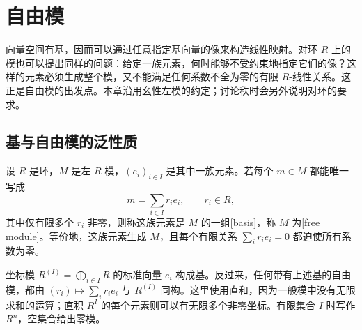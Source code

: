 
\section{自由模}
\label{b2:sec:0301}

向量空间有基，因而可以通过任意指定基向量的像来构造线性映射。对环 \(R\) 上的模也可以提出同样的问题：给定一族元素，何时能够不受约束地指定它们的像？这样的元素必须生成整个模，又不能满足任何系数不全为零的有限 \(R\)-线性关系。这正是自由模的出发点。本章沿用幺性左模的约定；讨论秩时会另外说明对环的要求。

%
%

\subsection{基与自由模的泛性质}
\label{b2:subsec:0301:01}

\begin{definition}\label{b2:def:free-module}
	设 \(R\) 是环，\(M\) 是左 \(R\) 模，\((e_i)_{i\in I}\) 是其中一族元素。若每个 \(m\in M\) 都能唯一写成
	\[
		m=\sum_{i\in I}r_i e_i,\qquad r_i\in R,
	\]
	其中仅有限多个 \(r_i\) 非零，则称这族元素是 \(M\) 的一组[basis]，称 \(M\) 为[free module]。等价地，这族元素生成 \(M\)，且每个有限关系 \(\sum_i r_i e_i=0\) 都迫使所有系数为零。
\end{definition}

坐标模 \(R^{(I)}=\bigoplus_{i\in I}R\) 的标准向量 \(e_i\) 构成基。反过来，任何带有上述基的自由模，都由 \((r_i)\mapsto\sum_i r_i e_i\) 与 \(R^{(I)}\) 同构。这里使用直和，因为一般模中没有无限求和的运算；直积 \(R^I\) 的每个元素则可以有无限多个非零坐标。有限集合 \(I\) 时写作 \(R^n\)，空集合给出零模。

